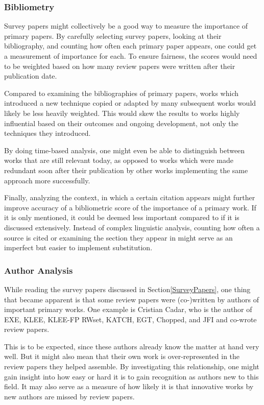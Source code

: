\documentclass{article}
\begin{document}
\begin{multicols}{2}
    \subsubsection{Bibliometry}
    Survey papers might collectively be a good way to measure the importance of primary papers. By carefully selecting survey papers, looking at their bibliography, and counting how often each primary paper appears, one could get a measurement of importance for each. To ensure fairness, the scores would need to be weighted based on how many review papers were written after their publication date.

    Compared to examining the bibliographies of primary papers, works which introduced a new technique copied or adapted by many subsequent works would likely be less heavily weighted. This would skew the results to works highly influential based on their outcomes and ongoing development, not only the techniques they introduced.

    By doing time-based analysis, one might even be able to distinguish between works that are still relevant today, as opposed to works which were made redundant soon after their publication by other works implementing the same approach more successfully.

    Finally, analyzing the context, in which a certain citation appears might further improve accuracy of a bibliometric score of the importance of a primary work. If it is only mentioned, it could be deemed less important compared to if it is discussed extensively. Instead of complex linguistic analysis, counting how often a source is cited or examining the section they appear in might serve as an imperfect but easier to implement substitution.

    \subsubsection{Author Analysis}
    While reading the survey papers discussed in Section\ref{SurveyPapers}, one thing that became apparent is that some review papers were (co-)written by authors of important primary works. One example is Cristian Cadar, who is the author of EXE\cite{EXE}, KLEE\cite{KLEE}, KLEE-FP\cite{KLEEFP} RWset\cite{RWset}, KATCH\cite{KATCH}, EGT\cite{EGT}, Chopped\cite{Chopped}, and JFI\cite{JFI} and co-wrote review papers\cite{ReviewThreeDecades, ChallengesAndReflections, PreliminaryAssessment}.

    This is to be expected, since these authors already know the matter at hand very well. But it might also mean that their own work is over-represented in the review papers they helped assemble. By investigating this relationship, one might gain insight into how easy or hard it is to gain recognition as authors new to this field. It may also serve as a measure of how likely it is that innovative works by new authors are missed by review papers.


\end{multicols}
\end{document}

